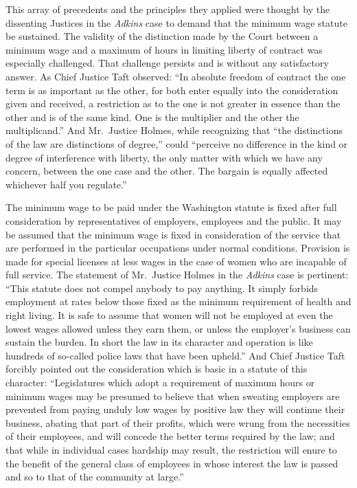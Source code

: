 \documentclass[
  letterpaper,
  11pt,
  DIV=9,
  openright]{scrbook}
\begin{document}
This array of precedents and the principles they applied were thought by
the dissenting Justices in the \emph{Adkins} case to demand that the
minimum wage statute be sustained. The validity of the distinction made
by the Court between a minimum wage and a maximum of hours in limiting
liberty of contract was especially challenged. That challenge persists
and is without any satisfactory answer. As Chief Justice Taft observed:
``In absolute freedom of contract the one term is as important as the
other, for both enter equally into the consideration given and received,
a restriction as to the one is not greater in essence than the other and
is of the same kind. One is the multiplier and the other the
multiplicand.'' And Mr.~Justice Holmes, while recognizing that ``the
distinctions of the law are distinctions of degree,'' could ``perceive
no difference in the kind or degree of interference with liberty, the
only matter with which we have any concern, between the one case and the
other. The bargain is equally affected whichever half you regulate.''

The minimum wage to be paid under the Washington statute is fixed after
full consideration by representatives of employers, employees and the
public. It may be assumed that the minimum wage is fixed in
consideration of the service that are performed in the particular
occupations under normal conditions. Provision is made for special
licenses at less wages in the case of women who are incapable of full
service. The statement of Mr.~Justice Holmes in the \emph{Adkins} case
is pertinent: ``This statute does not compel anybody to pay anything. It
simply forbids employment at rates below those fixed as the minimum
requirement of health and right living. It is safe to assume that women
will not be employed at even the lowest wages allowed unless they earn
them, or unless the employer's business can sustain the burden. In short
the law in its character and operation is like hundreds of so-called
police laws that have been upheld.'' And Chief Justice Taft forcibly
pointed out the consideration which is basic in a statute of this
character: ``Legislatures which adopt a requirement of maximum hours or
minimum wages may be presumed to believe that when sweating employers
are prevented from paying unduly low wages by positive law they will
continue their business, abating that part of their profits, which were
wrung from the necessities of their employees, and will concede the
better terms required by the law; and that while in individual cases
hardship may result, the restriction will enure to the benefit of the
general class of employees in whose interest the law is passed and so to
that of the community at large.''
\end{document}
